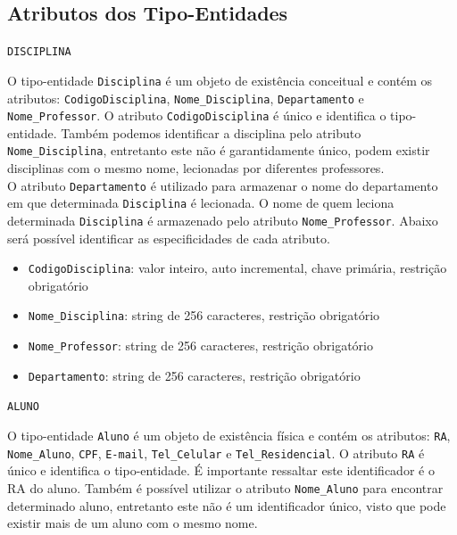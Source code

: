 \documentclass[12pt,a4paper]{article}
\begin{document}
\subsection{Atributos dos Tipo-Entidades} \label{atributos_entidades}

\vspace{0.5cm}
\begin{center}
    \texttt{DISCIPLINA}
\end{center}

\hspace{6}O tipo-entidade {\texttt{Disciplina}} é um objeto de existência conceitual e contém os atributos: {\texttt{CodigoDisciplina}}, {\texttt{Nome\_Disciplina}}, {\texttt{Departamento}} e {\texttt{Nome\_Professor}}. O atributo {\texttt{CodigoDisciplina}} é único e identifica o tipo-entidade. Também podemos identificar a disciplina pelo atributo {\texttt{Nome\_Disciplina}}, entretanto este não é garantidamente único, podem existir disciplinas com o mesmo nome, lecionadas por diferentes professores.\\

O atributo {\texttt{Departamento}} é utilizado para armazenar o nome do departamento em que determinada \texttt{Disciplina} é lecionada. O nome de quem leciona determinada \texttt{Disciplina} é armazenado pelo atributo {\texttt{Nome\_Professor}}. Abaixo será possível identificar as especificidades de cada atributo. \\

\begin{itemize}
    \item {\texttt{CodigoDisciplina}}: valor inteiro, auto incremental, chave primária, restrição obrigatório
    \item {\texttt{Nome\_Disciplina}}: string de 256 caracteres, restrição obrigatório
    \item {\texttt{Nome\_Professor}}: string de 256 caracteres, restrição obrigatório
    \item {\texttt{Departamento}}: string de 256 caracteres, restrição obrigatório
\end{itemize}

\vspace{0.5cm}
\begin{center}
    \texttt{ALUNO}
\end{center}

O tipo-entidade {\texttt{Aluno}} é um objeto de existência física e contém os atributos: {\texttt{RA}}, {\texttt{Nome\_Aluno}}, {\texttt{CPF}}, {\texttt{E-mail}}, {\texttt{Tel\_Celular} e \texttt{Tel\_Residencial}}. O atributo {\texttt{RA}} é único e identifica o tipo-entidade. É importante ressaltar este identificador é o RA do aluno. Também é possível utilizar o atributo {\texttt{Nome\_Aluno}} para encontrar determinado aluno, entretanto este não é um identificador único, visto que pode existir mais de um aluno com o mesmo nome.\\
\end{document}
